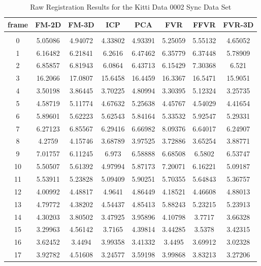
\begin{center}
\begin{longtable}{cccccccc}
\caption{Raw Registration Results for the Kitti Data 0002 Sync Data Set} \\
\label{tab:kittidata0002syncFULL}
\endfirsthead
\endhead
\textbf{frame} & \textbf{FM-2D} & \textbf{FM-3D} & \textbf{ICP} & \textbf{PCA} & \textbf{FVR} & \textbf{FFVR} & \textbf{FVR-3D} \\
\hline \\
0 & 5.05086 & 4.94072 & 4.33802 & 4.93391 & 5.25059 & 5.55132 & 4.65052\\
1 & 6.16482 & 6.21841 & 6.2616 & 6.47462 & 6.35779 & 6.37448 & 5.78909\\
2 & 6.85857 & 6.81943 & 6.0864 & 6.43713 & 6.15429 & 7.30368 & 6.521\\
3 & 16.2066 & 17.0807 & 15.6458 & 16.4459 & 16.3367 & 16.5471 & 15.9051\\
4 & 3.50198 & 3.86445 & 3.70225 & 4.80994 & 3.30395 & 5.12324 & 3.25735\\
5 & 4.58719 & 5.11774 & 4.67632 & 5.25638 & 4.45767 & 4.54029 & 4.41654\\
6 & 5.89601 & 5.62223 & 5.62543 & 5.84164 & 5.33532 & 5.92547 & 5.29331\\
7 & 6.27123 & 6.85567 & 6.29416 & 6.66982 & 8.09376 & 6.64017 & 6.24907\\
8 & 4.2759 & 4.15746 & 3.68789 & 3.97525 & 3.72886 & 3.65254 & 3.88771\\
9 & 7.01757 & 6.11245 & 6.973 & 6.58888 & 6.68508 & 6.5802 & 6.53747\\
10 & 5.50507 & 5.61392 & 4.97994 & 5.87173 & 7.20071 & 6.16221 & 5.09187\\
11 & 5.53911 & 5.23828 & 5.09409 & 5.90251 & 5.70355 & 5.64843 & 5.36757\\
12 & 4.00992 & 4.48817 & 4.9641 & 4.86449 & 4.18521 & 4.46608 & 4.88013\\
13 & 4.79772 & 4.38202 & 4.54437 & 4.85413 & 5.88243 & 5.23215 & 5.23913\\
14 & 4.30203 & 3.80502 & 3.47925 & 3.95896 & 4.10798 & 3.7717 & 3.66328\\
15 & 3.29963 & 4.56142 & 3.7165 & 4.39814 & 3.44285 & 3.5378 & 3.42315\\
16 & 3.62452 & 3.4494 & 3.99358 & 3.41332 & 3.4495 & 3.69912 & 3.02328\\
17 & 3.92782 & 4.51608 & 3.24577 & 3.59198 & 3.99868 & 3.83213 & 3.27206\\

\end{longtable}
\end{center}
